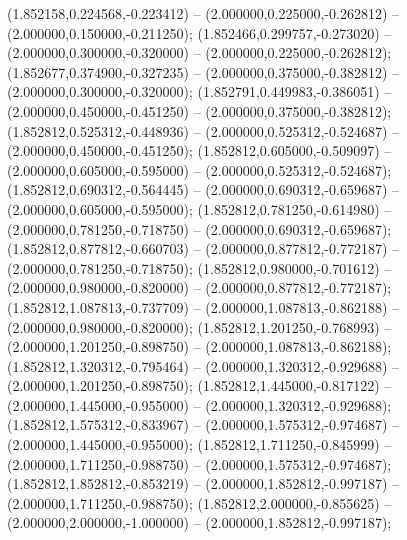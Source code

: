  (1.852158,0.224568,-0.223412) -- (2.000000,0.225000,-0.262812) -- (2.000000,0.150000,-0.211250);
 (1.852466,0.299757,-0.273020) -- (2.000000,0.300000,-0.320000) -- (2.000000,0.225000,-0.262812);
 (1.852677,0.374900,-0.327235) -- (2.000000,0.375000,-0.382812) -- (2.000000,0.300000,-0.320000);
 (1.852791,0.449983,-0.386051) -- (2.000000,0.450000,-0.451250) -- (2.000000,0.375000,-0.382812);
 (1.852812,0.525312,-0.448936) -- (2.000000,0.525312,-0.524687) -- (2.000000,0.450000,-0.451250);
 (1.852812,0.605000,-0.509097) -- (2.000000,0.605000,-0.595000) -- (2.000000,0.525312,-0.524687);
 (1.852812,0.690312,-0.564445) -- (2.000000,0.690312,-0.659687) -- (2.000000,0.605000,-0.595000);
 (1.852812,0.781250,-0.614980) -- (2.000000,0.781250,-0.718750) -- (2.000000,0.690312,-0.659687);
 (1.852812,0.877812,-0.660703) -- (2.000000,0.877812,-0.772187) -- (2.000000,0.781250,-0.718750);
 (1.852812,0.980000,-0.701612) -- (2.000000,0.980000,-0.820000) -- (2.000000,0.877812,-0.772187);
 (1.852812,1.087813,-0.737709) -- (2.000000,1.087813,-0.862188) -- (2.000000,0.980000,-0.820000);
 (1.852812,1.201250,-0.768993) -- (2.000000,1.201250,-0.898750) -- (2.000000,1.087813,-0.862188);
 (1.852812,1.320312,-0.795464) -- (2.000000,1.320312,-0.929688) -- (2.000000,1.201250,-0.898750);
 (1.852812,1.445000,-0.817122) -- (2.000000,1.445000,-0.955000) -- (2.000000,1.320312,-0.929688);
 (1.852812,1.575312,-0.833967) -- (2.000000,1.575312,-0.974687) -- (2.000000,1.445000,-0.955000);
 (1.852812,1.711250,-0.845999) -- (2.000000,1.711250,-0.988750) -- (2.000000,1.575312,-0.974687);
 (1.852812,1.852812,-0.853219) -- (2.000000,1.852812,-0.997187) -- (2.000000,1.711250,-0.988750);
 (1.852812,2.000000,-0.855625) -- (2.000000,2.000000,-1.000000) -- (2.000000,1.852812,-0.997187);
